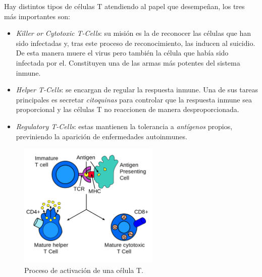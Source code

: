 Hay distintos tipos de células T atendiendo al papel que desempeñan, los tres más importantes son: 
\begin{itemize}
	\item \textit{Killer or Cytotoxic T-Cells}: su misión es la de reconocer las células que han sido infectadas y, tras este proceso de reconocimiento, las inducen al suicidio. De esta manera muere el virus pero también la célula que había sido infectada por el. Constituyen una de las armas más potentes del sistema inmune.
	
	\item \textit{Helper T-Cells}: se encargan de regular la respuesta inmune. Una de sus tareas principales es secretar \textit{citoquinas} para controlar que la respuesta inmune sea proporcional y las células T no reaccionen de manera desproporcionada.
	
	\item \textit{Regulatory T-Cells}: estas mantienen la tolerancia a \textit{antígenos} propios, previniendo la aparición de enfermedades autoinmunes.
\end{itemize}



\begin{figure}[t]
	\centering
	\includegraphics[width=0.6\textwidth]{Imagenes/EstadoDeLaCuestion/Antigen_presentation}
	\caption{Proceso de activación de una célula T.}
	\label{fig:antigen_presentation}
\end{figure}


